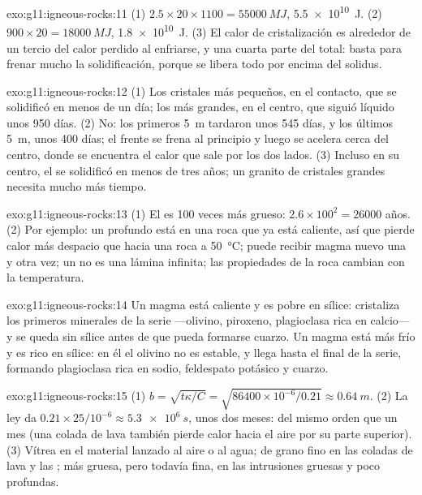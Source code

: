 \begin{solution}{exo:g11:igneous-rocks:11}
(1) $2.5 \times 20 \times 1100 = \qty{55000}{MJ}$, \qty{5.5e10}{J}.
(2) $900 \times 20 = \qty{18000}{MJ}$, \qty{1.8e10}{J}. (3) El calor de
cristalización es alrededor de un tercio del calor perdido al enfriarse, y una
cuarta parte del total: basta para frenar mucho la solidificación, porque se
libera todo por encima del solidus.
\end{solution}

\begin{solution}{exo:g11:igneous-rocks:12}
(1) Los cristales más pequeños, en el contacto, que se solidificó en menos de
un día; los más grandes, en el centro, que siguió líquido unos 950 días.
(2) No: los primeros \qty{5}{m} tardaron unos 545 días, y los últimos
\qty{5}{m}, unos 400 días; el frente se frena al principio y luego se acelera
cerca del centro, donde se encuentra el calor que sale por los dos lados.
(3) Incluso en su centro, el  se solidificó en menos de tres años;
un granito de cristales grandes necesita mucho más tiempo.
\end{solution}

\begin{solution}{exo:g11:igneous-rocks:13}
(1) El  es 100 veces más grueso: $2.6 \times 100^2 = \num{26000}$
años. (2) Por ejemplo: un  profundo está en una roca que ya está
caliente, así que pierde calor más despacio que hacia una roca a
\qty{50}{\degreeCelsius}; puede recibir magma nuevo una y otra vez; un 
no es una lámina infinita; las propiedades de la roca cambian con la
temperatura.
\end{solution}

\begin{solution}{exo:g11:igneous-rocks:14}
Un magma  está caliente y es pobre en sílice: cristaliza los primeros
minerales de la serie ---olivino, piroxeno, plagioclasa rica en calcio--- y se
queda sin sílice antes de que pueda formarse cuarzo. Un magma  está
más frío y es rico en sílice: en él el olivino no es estable, y llega hasta el
final de la serie, formando plagioclasa rica en sodio, feldespato potásico y
cuarzo.
\end{solution}

\begin{solution}{exo:g11:igneous-rocks:15}
(1) $b = \sqrt{t\kappa/C} = \sqrt{86400 \times 10^{-6}/0.21} \approx
\qty{0.64}{m}$. (2) La ley da $0.21 \times 25/10^{-6} \approx
\qty{5.3e6}{s}$, unos dos meses: del mismo orden que un mes (una colada de
lava también pierde calor hacia el aire por su parte superior). (3) Vítrea en
el material lanzado al aire o al agua; de grano fino en las coladas de lava y
las ; más gruesa, pero todavía fina, en las intrusiones
gruesas y poco profundas.
\end{solution}

